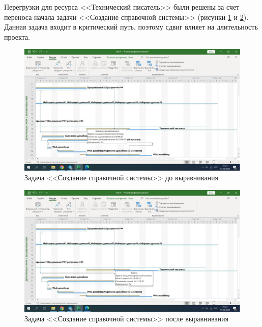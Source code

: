 Перегрузки для ресурса <<Технический писатель>> были решены за счет переноса начала задачи <<Создание справочной системы>> (рисунки \ref{img:task1-writer-before} и \ref{img:task1-writer-after}). Данная задача входит в критический путь, поэтому сдвиг влияет на длительность проекта.

\begin{figure}[H]
	\begin{center}
		\includegraphics[scale=0.3]{inc/img/task1-writer-before.jpg}
	\end{center}
	\captionsetup{justification=centering}
	\caption{Задача <<Создание справочной системы>> до выравнивания}
	\label{img:task1-writer-before}
\end{figure}

\begin{figure}[H]
	\begin{center}
		\includegraphics[scale=0.3]{inc/img/task1-writer-after.jpg}
	\end{center}
	\captionsetup{justification=centering}
	\caption{Задача <<Создание справочной системы>> после выравнивания}
	\label{img:task1-writer-after}
\end{figure}

